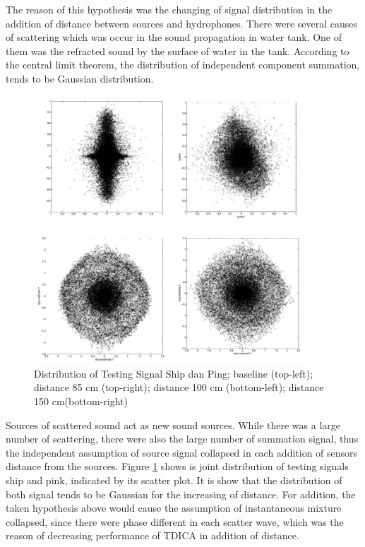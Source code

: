 \documentclass[a4paper]{jpconf}
\begin{document}
The reason of this hypothesis was the changing of signal distribution in the addition of distance between sources and hydrophones.  There were several causes of scattering which was occur in the sound propagation in water tank. One of them was the refracted sound by the surface of water in the tank. According to the central limit theorem, the distribution of independent component summation, tends to be Gaussian distribution.

\begin{figure}[h]
\begin{center}
\includegraphics[width=4in]{gausDist.png}
\end{center}
\caption{\label{pict:gaustDist}Distribution of Testing Signal Ship dan Ping; baseline (top-left); distance 85 cm (top-right); distance 100 cm (bottom-left); distance 150 cm(bottom-right)}
\end{figure}

Sources of scattered sound act as new sound sources. While there was a large number of scattering, there were also the large number of summation signal, thus the independent assumption of source signal collapsed in each addition of sensors distance from the sources. Figure \ref{pict:gaustDist} shows is joint distribution of testing signals ship and pink, indicated by its scatter plot. It is show that the distribution of both signal tends to be Gaussian for the increasing of distance. For addition, the taken hypothesis above would cause the assumption of instantaneous mixture collapsed, since there were phase different in each scatter wave, which was the reason of decreasing performance of TDICA in addition of distance.
\end{document}
